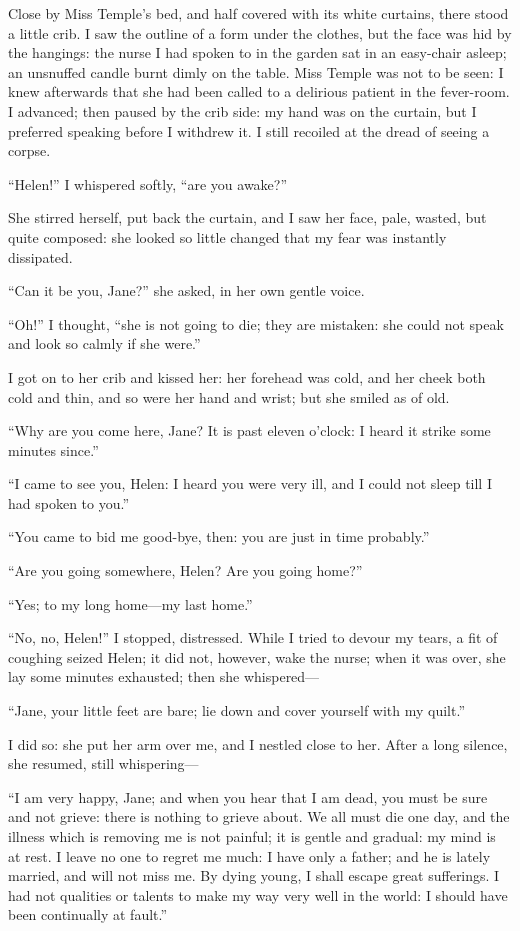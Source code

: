 Close by Miss Temple's bed, and half covered with its white curtains,
there stood a little crib. I saw the outline of a form under the
clothes, but the face was hid by the hangings: the nurse I had spoken to
in the garden sat in an easy-chair asleep; an unsnuffed candle burnt
dimly on the table. Miss Temple was not to be seen: I knew afterwards
that she had been called to a delirious patient in the fever-room. I
advanced; then paused by the crib side: my hand was on the curtain, but
I preferred speaking before I withdrew it. I still recoiled at the
dread of seeing a corpse.

\enquote{Helen!} I whispered softly, \enquote{are you awake?}

She stirred herself, put back the curtain, and I saw her face, pale,
wasted, but quite composed: she looked so little changed that my fear
was instantly dissipated.

\enquote{Can it be you, Jane?} she asked, in her own gentle voice.

\enquote{Oh!} I thought, \enquote{she is not going to die; they are
mistaken: she could not speak and look so calmly if she were.}

I got on to her crib and kissed her: her forehead was cold, and her
cheek both cold and thin, and so were her hand and wrist; but she smiled
as of old.

\enquote{Why are you come here, Jane? It is past eleven o'clock: I
heard it strike some minutes since.}

\enquote{I came to see you, Helen: I heard you were very ill, and I
could not sleep till I had spoken to you.}

\enquote{You came to bid me good-bye, then: you are just in time
probably.}

\enquote{Are you going somewhere, Helen? Are you going home?}

\enquote{Yes; to my long home---my last home.}

\enquote{No, no, Helen!} I stopped, distressed. While I tried to
devour my tears, a fit of coughing seized Helen; it did not, however,
wake the nurse; when it was over, she lay some minutes exhausted; then
she whispered---

\enquote{Jane, your little feet are bare; lie down and cover yourself
with my quilt.}

I did so: she put her arm over me, and I nestled close to her. After a
long silence, she resumed, still whispering---

\enquote{I am very happy, Jane; and when you hear that I am dead, you
must be sure and not grieve: there is nothing to grieve about. We all
must die one day, and the illness which is removing me is not painful;
it is gentle and gradual: my mind is at rest. I leave no one to regret
me much: I have only a father; and he is lately married, and will not
miss me. By dying young, I shall escape great sufferings. I had not
qualities or talents to make my way very well in the world: I should
have been continually at fault.}

